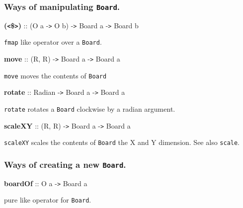  

\subsubsection{Ways of manipulating {\tt Board}.}

 

{{\bf ({\tt <}\${\tt >})} ::  (O a -{\tt >} O b) -{\tt >} Board a -{\tt >} Board b}

\hspace{0.05\textwidth}\begin{minipage}{0.9\textwidth}{\tt fmap} like operator over a {\tt Board}.\end{minipage}

 

{{\bf move} ::  (R, R) -{\tt >} Board a -{\tt >} Board a}

\hspace{0.05\textwidth}\begin{minipage}{0.9\textwidth}{\tt move} moves the contents of {\tt Board}\end{minipage}

 

{{\bf rotate} ::  Radian -{\tt >} Board a -{\tt >} Board a}

\hspace{0.05\textwidth}\begin{minipage}{0.9\textwidth}{\tt rotate} rotates a {\tt Board} clockwise by a radian argument.\end{minipage}

 

{{\bf scaleXY} ::  (R, R) -{\tt >} Board a -{\tt >} Board a}

\hspace{0.05\textwidth}\begin{minipage}{0.9\textwidth}{\tt scaleXY} scales the contents of {\tt Board} the X and Y dimension.  See also {\tt scale}.\end{minipage}

 

\subsubsection{Ways of creating a new {\tt Board}.}

 

{{\bf boardOf} ::  O a -{\tt >} Board a}

\hspace{0.05\textwidth}\begin{minipage}{0.9\textwidth}pure like operator for {\tt Board}.	\end{minipage}

